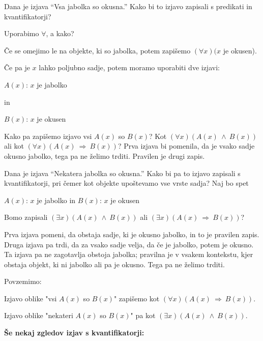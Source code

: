 \documentclass[11pt,paper=b5,footinclude,headinclude]{scrbook} %
\newcounter{example}
\def\inn {{~\wedge~}}
\def\sledi {{~\Rightarrow~}}
\begin{document}
\medskip
\begin{sloppypar}
\begin{example*}
Dana je izjava ``Vsa jabolka so okusna.''
Kako bi to izjavo zapisali s predikati in kvantifikatorji?

Uporabimo $\forall$, a kako?

Če se omejimo le na objekte, ki so jabolka, potem zapišemo $(\forall x)(x$ je okusen).

Če pa je $x$ lahko poljubno sadje, potem moramo uporabiti dve izjavi:

$A(x)$: $x$ je jabolko

 in

$B(x)$: $x$ je okusen

Kako pa zapišemo izjavo vsi $A(x)$ so $B(x)$? Kot $(\forall x)(A(x)\inn B(x))$
ali kot $(\forall x)(A(x) \sledi B(x))$?
Prva izjava bi pomenila, da je vsako sadje okusno jabolko, tega pa ne želimo trditi. Pravilen je drugi zapis.
\end{example*}
\end{sloppypar}

\medskip
\begin{example*}
Dana je izjava ``Nekatera jabolka so okusna.'' Kako bi pa to izjavo zapisali s kvantifikatorji, pri čemer kot objekte upoštevamo vse vrste sadja?
Naj bo spet

$A(x)$: $x$ je jabolko
 in
$B(x)$: $x$ je okusen

Bomo zapisali $(\exists x)(A(x)\inn B(x))$ ali $(\exists x)(A(x) \sledi B(x))$?

Prva izjava pomeni, da obstaja sadje, ki je okusno jabolko, in to je pravilen zapis.
Druga izjava pa trdi, da za vsako sadje velja, da če je jabolko, potem je okusno. Ta izjava pa ne zagotavlja obstoja jabolka;
pravilna je v vsakem kontekstu, kjer obstaja objekt, ki ni jabolko ali pa je okusno. Tega pa ne želimo trditi.
\end{example*}

\medskip
Povzemimo:

{Izjavo oblike "vsi $A(x)$ so $B(x)$" zapišemo kot $(\forall x)(A(x)\sledi B(x))$.

Izjavo oblike "nekateri $A(x)$ so $B(x)$" pa kot $(\exists x)(A(x)\inn B(x))$.}

\medskip

\medskip
\noindent\textbf{ Še nekaj zgledov izjav s kvantifikatorji:}
\end{document}
